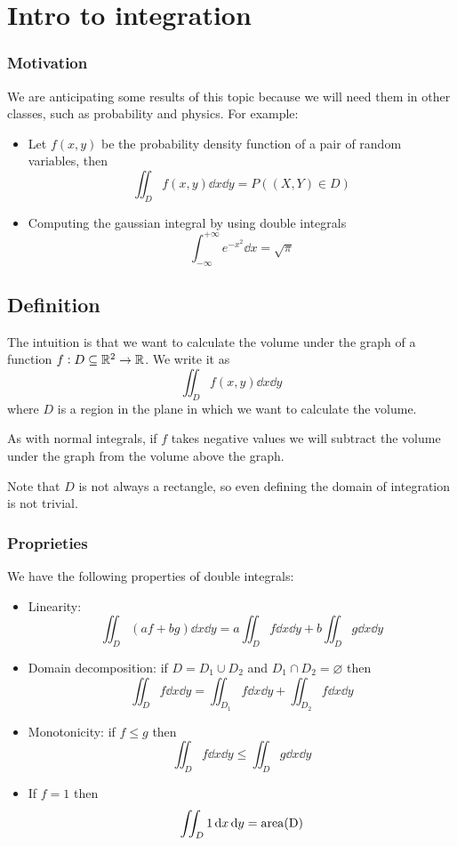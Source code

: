 \documentclass[12pt]{report}
\begin{document}
\section{Intro to integration}

\subsubsection{Motivation}

We are anticipating some results of this topic because we will need them in other classes, such as probability and physics.
For example:
\begin{itemize}
    \item Let $f(x, y)$ be the probability density function of a pair of random variables, then
          $$
              \iint_D f(x, y) \dd{x} \dd{y} = P((X, Y) \in D)
          $$
    \item Computing the gaussian integral by using double integrals
          $$
              \int_{-\infty}^{+\infty} e^{-x^2} \dd{x} = \sqrt{\pi}
          $$
\end{itemize}

\subsection{Definition}

The intuition is that we want to calculate the volume under the graph of a function $f: D \subseteq \mathbb{R}^2 \to \mathbb{R}$.
We write it as
$$
    \iint_D f(x, y) \dd{x} \dd{y}
$$
where $D$ is a region in the plane in which we want to calculate the volume.

As with normal integrals, if $f$ takes negative values we will subtract the volume under the graph from the volume above the graph.

Note that $D$ is not always a rectangle, so even defining the domain of integration is not trivial.

\subsubsection{Proprieties}

We have the following properties of double integrals:

\begin{itemize}
    \item Linearity:
          $$
              \iint_D (af + bg) \dd{x} \dd{y} = a \iint_D f \dd{x} \dd{y} + b \iint_D g \dd{x} \dd{y}
          $$
    \item Domain decomposition: if $D = D_1 \cup D_2$ and $D_1 \cap D_2 = \varnothing$ then
          $$
              \iint_D f \dd{x} \dd{y} = \iint_{D_1} f \dd{x} \dd{y} + \iint_{D_2} f \dd{x} \dd{y}
          $$
    \item Monotonicity: if $f \leq g$ then
          $$
              \iint_D f \dd{x} \dd{y} \leq \iint_D g \dd{x} \dd{y}
          $$
    \item If $f = 1$ then
          $$
              \iint_D 1 \dd{x} \dd{y} = \operatorfont{area}(D)
          $$
\end{itemize}
\end{document}
